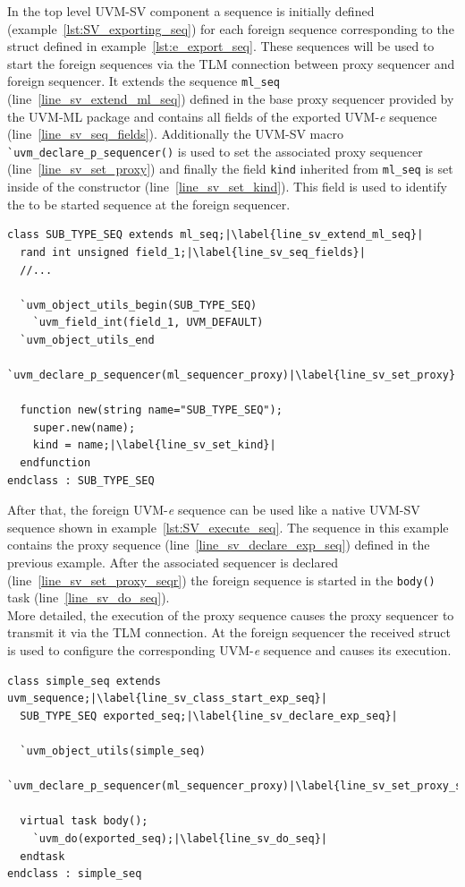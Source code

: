 In the top level UVM-SV component a sequence is initially defined (example~\ref{lst:SV_exporting_seq}) for each foreign sequence corresponding to the struct defined in example~\ref{lst:e_export_seq}. These sequences will be used to start the foreign sequences via the TLM connection between proxy sequencer and foreign sequencer. It extends the sequence \lstinline$ml_seq$ (line~\ref{line_sv_extend_ml_seq}) defined in the base proxy sequencer provided by the UVM-ML package and contains all fields of the exported UVM-\textit{e} sequence (line~\ref{line_sv_seq_fields}). Additionally the UVM-SV macro \lstinline$`uvm_declare_p_sequencer()$ is used to set the associated proxy sequencer (line~\ref{line_sv_set_proxy}) and finally the field \lstinline$kind$ inherited from \lstinline$ml_seq$ is set inside of the constructor (line~\ref{line_sv_set_kind}). This field is used to identify the to be started sequence at the foreign sequencer.
\lstset{language=SystemVerilog, numbers = left, escapechar=|, breaklines=true}
\begin{lstlisting}[frame=htrbl, caption={SystemVerilog: exporting the UVM-\textit{e} sequence},
label={lst:SV_exporting_seq}]
class SUB_TYPE_SEQ extends ml_seq;|\label{line_sv_extend_ml_seq}|
  rand int unsigned field_1;|\label{line_sv_seq_fields}|
  //...

  `uvm_object_utils_begin(SUB_TYPE_SEQ)
    `uvm_field_int(field_1, UVM_DEFAULT)
  `uvm_object_utils_end
  `uvm_declare_p_sequencer(ml_sequencer_proxy)|\label{line_sv_set_proxy}|

  function new(string name="SUB_TYPE_SEQ");
    super.new(name);
    kind = name;|\label{line_sv_set_kind}|
  endfunction
endclass : SUB_TYPE_SEQ
\end{lstlisting}
After that, the foreign UVM-\textit{e} sequence can be used like a native UVM-SV sequence shown in example~\ref{lst:SV_execute_seq}. The sequence in this example contains the proxy sequence (line~\ref{line_sv_declare_exp_seq}) defined in the previous example. After the associated sequencer is declared (line~\ref{line_sv_set_proxy_seqr}) the foreign sequence is started in the \lstinline$body()$ task (line~\ref{line_sv_do_seq}).\\
More detailed, the execution of the proxy sequence causes the proxy sequencer to transmit it via the TLM connection. At the foreign sequencer the received struct is used to configure the corresponding UVM-\textit{e} sequence and causes its execution.
\lstset{language=SystemVerilog, numbers = left, escapechar=|, breaklines=true}
\begin{lstlisting}[frame=htrbl, caption={SystemVerilog: executing the exported UVM-\textit{e} sequence},
label={lst:SV_execute_seq}]
class simple_seq extends uvm_sequence;|\label{line_sv_class_start_exp_seq}|
  SUB_TYPE_SEQ exported_seq;|\label{line_sv_declare_exp_seq}|

  `uvm_object_utils(simple_seq)
  `uvm_declare_p_sequencer(ml_sequencer_proxy)|\label{line_sv_set_proxy_seqr}|

  virtual task body();
    `uvm_do(exported_seq);|\label{line_sv_do_seq}|
  endtask
endclass : simple_seq
\end{lstlisting}
